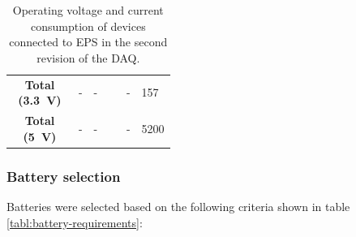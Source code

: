 \documentclass[]{report}
\begin{document}
\begin{table}[H]
\begin{tabular}{|c|c|L{0.2\linewidth}|c|L{0.2\linewidth}|}
    \hline
    \textbf{Total (\SI{3.3}{\volt})} & -                             & -                                              & -                 & 157                                       \\
    \textbf{Total (\SI{5}{\volt})}   & -                             & -                                              & -                 & 5200                                      \\
    \hline
  \end{tabular}
  \caption{Operating voltage and current consumption of devices connected to EPS in the second revision of the DAQ.}
  \label{tabl:eps-power-budget}
\end{table}

\subsubsection{Battery selection}
\label{sec:battery-selection}

Batteries were selected based on the following criteria shown in table \ref{tabl:battery-requirements}:
\end{document}
